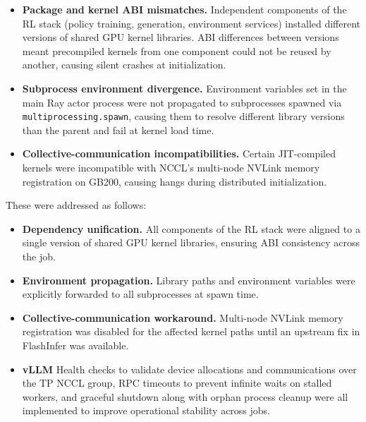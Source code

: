 \begin{itemize}
  \item \textbf{Package and kernel ABI mismatches.} Independent components of the RL stack 
    (policy training, generation, environment services) installed different versions of 
    shared GPU kernel libraries. ABI differences between versions meant precompiled kernels 
    from one component could not be reused by another, causing silent crashes at 
    initialization.

  \item \textbf{Subprocess environment divergence.} Environment variables set in the main 
    Ray actor process were not propagated to subprocesses spawned via 
    \texttt{multiprocessing.spawn}, causing them to resolve different library versions than 
    the parent and fail at kernel load time.

  \item \textbf{Collective-communication incompatibilities.} Certain JIT-compiled kernels 
    were incompatible with NCCL's multi-node NVLink memory registration on GB200, causing 
    hangs during distributed initialization.
\end{itemize}

\noindent These were addressed as follows:

\begin{itemize}
  \item \textbf{Dependency unification.} All components of the RL stack were aligned to a 
    single version of shared GPU kernel libraries, ensuring ABI consistency across the job.

  \item \textbf{Environment propagation.} Library paths and environment variables were 
    explicitly forwarded to all subprocesses at spawn time.

  \item \textbf{Collective-communication workaround.} Multi-node NVLink memory registration 
    was disabled for the affected kernel paths until an upstream fix in FlashInfer was available.

  \item \textbf{vLLM} Health checks to validate device allocations and communications over the TP NCCL group, RPC timeouts to prevent infinite waits on stalled workers, and graceful shutdown along with orphan process cleanup were all implemented to improve operational stability across jobs.

    
\end{itemize}


